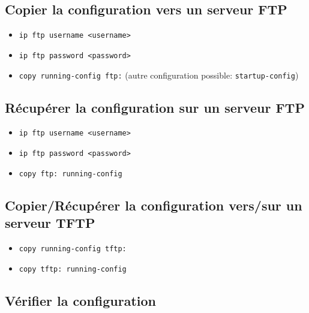 \documentclass[a4paper]{article}
\begin{document}
\subsection{Copier la configuration vers un serveur FTP}



\begin{itemize}[label=\textbf{–}]
    \item \texttt{ip ftp username <username>}
    \item \texttt{ip ftp password <password>}
    \item \texttt{copy running-config ftp:} (autre configuration possible: \texttt{startup-config})
\end{itemize}





\subsection{Récupérer la configuration sur un serveur FTP}



\begin{itemize}[label=\textbf{–}]
    \item \texttt{ip ftp username <username>}
    \item \texttt{ip ftp password <password>}
    \item \texttt{copy ftp: running-config}
\end{itemize}





\subsection{Copier/Récupérer la configuration vers/sur un serveur TFTP}



\begin{itemize}[label=\textbf{–}]
    \item \texttt{copy running-config tftp:}
    \item \texttt{copy tftp: running-config}
\end{itemize}





\subsection{Vérifier la configuration}
\end{document}

